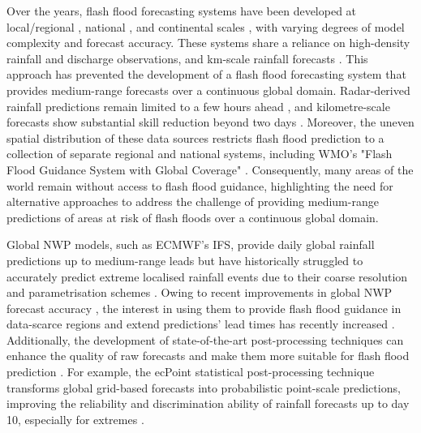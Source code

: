 Over  the years, flash flood forecasting systems have been developed at local/regional \citep{Speight_2018, Corral_2019, Ibarreche_2020, RamosFilho_2021, Shuvo_2021}, national \citep{Javelle_2016, Liu_2018}, and continental scales \citep{Gourley_2017, Raynaud_2015}, with varying degrees of model complexity and forecast accuracy. These systems share a reliance on high-density rainfall and discharge observations, and km-scale rainfall forecasts \citep{Braud_2014}. This approach has prevented the development of a flash flood forecasting system that provides medium-range forecasts over a continuous global domain. Radar-derived rainfall predictions remain limited to a few hours ahead \citep{Imhoff_2022}, and kilometre-scale forecasts show substantial skill reduction beyond two days \citep{Barrett_2019}. Moreover, the uneven spatial distribution of these data sources restricts flash flood prediction to a collection of separate regional and national systems, including WMO's "Flash Flood Guidance System with Global Coverage" \citep{Georgakakos_2022}. Consequently, many areas of the world remain without access to flash flood guidance, highlighting the need for alternative approaches to address the challenge of providing medium-range predictions of areas at risk of flash floods over a continuous global domain.

Global  NWP models, such as ECMWF’s IFS, provide daily global rainfall predictions up to medium-range leads but have historically struggled to accurately predict extreme localised rainfall events due to their coarse resolution and parametrisation schemes \citep{Emerton_2016, Wen_2021}. Owing to recent improvements in global NWP forecast accuracy \citep{Haiden_2023, Lavers_2021}, the interest in using them to provide flash flood guidance in data-scarce regions and extend predictions’ lead times has recently increased \citep{Bucherie_2022b}. Additionally, the development of state-of-the-art post-processing techniques can enhance the quality of raw forecasts and make them more suitable for flash flood prediction \citep{Vannitsem_2021}. For example, the ecPoint statistical post-processing technique transforms global grid-based forecasts into probabilistic point-scale predictions, improving the reliability and discrimination ability of rainfall forecasts up to day 10, especially for extremes \citep{Hewson_2021}.

